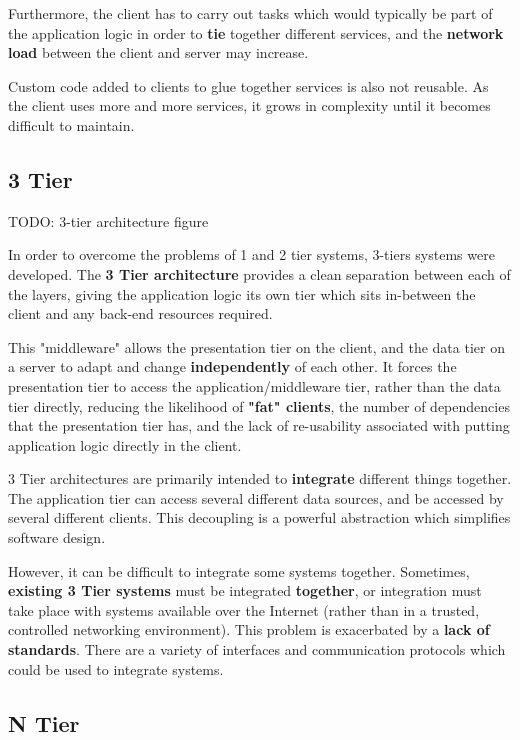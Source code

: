 \documentclass{article}
\begin{document}
Furthermore, the client has to carry out tasks which would typically be part of the application logic in order to \textbf{tie} together different services, and the \textbf{network load} between the client and server may increase.

Custom code added to clients to glue together services is also not reusable. As the client uses more and more services, it grows in complexity until it becomes difficult to maintain.

\subsection{3 Tier}

TODO: 3-tier architecture figure

In order to overcome the problems of 1 and 2 tier systems, 3-tiers systems were developed. The \textbf{3 Tier architecture} provides a clean separation between each of the layers, giving the application logic its own tier which sits in-between the client and any back-end resources required.

This "middleware" allows the presentation tier on the client, and the data tier on a server to adapt and change \textbf{independently} of each other. It forces the presentation tier to access the application/middleware tier, rather than the data tier directly, reducing the likelihood of \textbf{"fat" clients}, the number of dependencies that the presentation tier has, and the lack of re-usability associated with putting application logic directly in the client. 

3 Tier architectures are primarily intended to \textbf{integrate} different things together. The application tier can access several different data sources, and be accessed by several different clients. This decoupling is a powerful abstraction which simplifies software design.

However, it can be difficult to integrate some systems together. Sometimes, \textbf{existing 3 Tier systems} must be integrated \textbf{together}, or integration must take place with systems available over the Internet (rather than in a trusted, controlled networking environment). This problem is exacerbated by a \textbf{lack of standards}. There are a variety of interfaces and communication protocols which could be used to integrate systems.

\subsection{N Tier}
\end{document}
